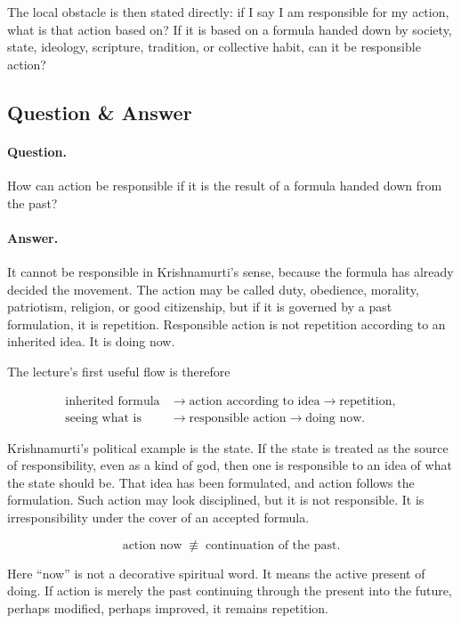 The local obstacle is then stated directly: if I say I am responsible for my action, what is that action based on? If it is based on a formula handed down by society, state, ideology, scripture, tradition, or collective habit, can it be responsible action?

\subsection{Question \& Answer}

\paragraph{Question.}
How can action be responsible if it is the result of a formula handed down from the past?

\paragraph{Answer.}
It cannot be responsible in Krishnamurti's sense, because the formula has already decided the movement. The action may be called duty, obedience, morality, patriotism, religion, or good citizenship, but if it is governed by a past formulation, it is repetition. Responsible action is not repetition according to an inherited idea. It is doing now.

The lecture's first useful flow is therefore

\begin{align}
\text{inherited formula}
&\longrightarrow \text{action according to idea}
\longrightarrow \text{repetition}, \\
\text{seeing what is}
&\longrightarrow \text{responsible action}
\longrightarrow \text{doing now}.
\end{align}

Krishnamurti's political example is the state. If the state is treated as the source of responsibility, even as a kind of god, then one is responsible to an idea of what the state should be. That idea has been formulated, and action follows the formulation. Such action may look disciplined, but it is not responsible. It is irresponsibility under the cover of an accepted formula.

\begin{equation}
\text{action now}
\;\not\equiv\;
\text{continuation of the past}.
\end{equation}

Here ``now'' is not a decorative spiritual word. It means the active present of doing. If action is merely the past continuing through the present into the future, perhaps modified, perhaps improved, it remains repetition.

